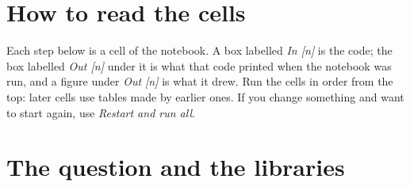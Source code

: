 \section{How to read the cells}
Each step below is a cell of the notebook. A box labelled \emph{In [n]} is the code; the box labelled \emph{Out [n]} under it is what that code printed when the notebook was run, and a figure under \emph{Out [n]} is what it drew. Run the cells in order from the top: later cells use tables made by earlier ones. If you change something and want to start again, use \emph{Restart and run all}.

\section{The question and the libraries}

